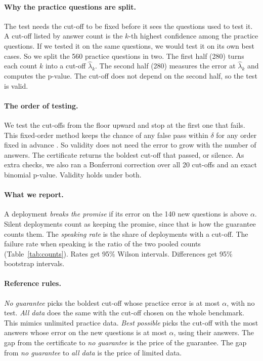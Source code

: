 \documentclass[11pt]{article}
\theoremstyle{plain}
\theoremstyle{definition}
\begin{document}
\paragraph{Why the practice questions are split.} The test needs the cut-off to be fixed before it sees the questions used to test it. A cut-off listed by answer count is the $k$-th highest confidence among the practice questions. If we tested it on the same questions, we would test it on its own best cases. So we split the 560 practice questions in two. The first half (280) turns each count $k$ into a cut-off $\hat\lambda_k$. The second half (280) measures the error at $\hat\lambda_k$ and computes the p-value. The cut-off does not depend on the second half, so the test is valid.

\paragraph{The order of testing.} We test the cut-offs from the floor upward and stop at the first one that fails. This fixed-order method keeps the chance of any false pass within $\delta$ for any order fixed in advance \citep{angelopoulos2022ltt}. So validity does not need the error to grow with the number of answers. The certificate returns the boldest cut-off that passed, or silence. As extra checks, we also ran a Bonferroni correction over all 20 cut-offs and an exact binomial p-value. Validity holds under both.

\paragraph{What we report.} A deployment \emph{breaks the promise} if its error on the 140 new questions is above $\alpha$. Silent deployments count as keeping the promise, since that is how the guarantee counts them. The \emph{speaking rate} is the share of deployments with a cut-off. The failure rate when speaking is the ratio of the two pooled counts (Table~\ref{tab:counts}). Rates get 95\% Wilson intervals. Differences get 95\% bootstrap intervals.

\paragraph{Reference rules.} \emph{No guarantee} picks the boldest cut-off whose practice error is at most $\alpha$, with no test. \emph{All data} does the same with the cut-off chosen on the whole benchmark. This mimics unlimited practice data. \emph{Best possible} picks the cut-off with the most answers whose error on the new questions is at most $\alpha$, using their answers. The gap from the certificate to \emph{no guarantee} is the price of the guarantee. The gap from \emph{no guarantee} to \emph{all data} is the price of limited data.
\end{document}

